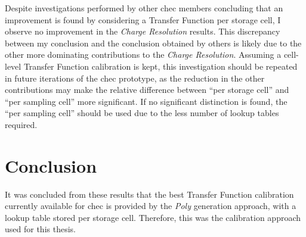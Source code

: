 Despite investigations performed by other \gls{chec} members concluding that an improvement is found by considering a Transfer Function per storage cell, I observe no improvement in the \textit{Charge Resolution} results. This discrepancy between my conclusion and the conclusion obtained by others is likely due to the other more dominating contributions to the \textit{Charge Resolution}. Assuming a cell-level Transfer Function calibration is kept, this investigation should be repeated in future iterations of the \gls{chec} prototype, as the reduction in the other contributions may make the relative difference between ``per storage cell'' and ``per sampling cell'' more significant. If no significant distinction is found, the ``per sampling cell'' should be used due to the less number of lookup tables required.

\section{Conclusion}

It was concluded from these results that the best Transfer Function calibration currently available for \gls{chec} is provided by the \textit{Poly} generation approach, with a lookup table stored per storage cell. Therefore, this was the calibration approach used for this thesis.